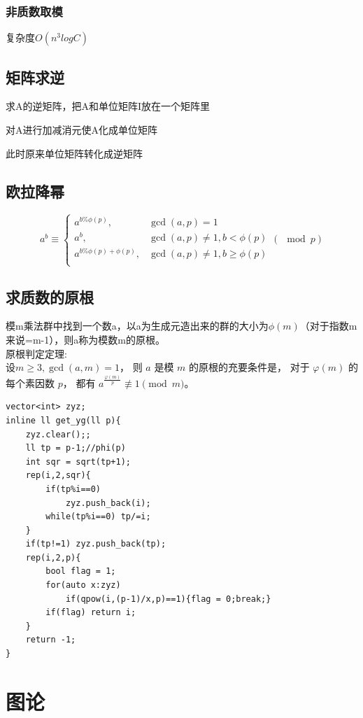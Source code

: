 \documentclass[a4]{ctexart}
\begin{document}
\subsubsection{非质数取模}
复杂度$O(n^3 logC)$

\subsection{矩阵求逆}
求A的逆矩阵，把A和单位矩阵I放在一个矩阵里\par
对A进行加减消元使A化成单位矩阵\par
此时原来单位矩阵转化成逆矩阵
\subsection{欧拉降幂}
$$
a^b \equiv \begin{cases}
a^{b\%\phi(p)} , & \gcd(a,p)=1\\
a^b , & \gcd(a,p)\neq 1,b<\phi(p)\\
a^{b\%\phi(p)+\phi(p)} , & \gcd(a,p)\neq 1 , b\geq \phi(p)\\
\end{cases}
(\mod p)
$$

\subsection{求质数的原根}
模m乘法群中找到一个数a，以a为生成元造出来的群的大小为$\phi(m)$（对于指数m来说=m-1），则a称为模数m的原根。\\
原根判定定理:\\
设$m \geq 3, \gcd(a,m)=1$，
则 $a$ 是模 $m$ 的原根的充要条件是，
对于 $\varphi(m)$ 的每个素因数 $p$，
都有 $a^{\frac{\varphi(m)}{p}}\not\equiv 1\pmod m$。
\begin{lstlisting}
vector<int> zyz;
inline ll get_yg(ll p){
    zyz.clear();;
    ll tp = p-1;//phi(p)
    int sqr = sqrt(tp+1);
    rep(i,2,sqr){
        if(tp%i==0)
            zyz.push_back(i);
        while(tp%i==0) tp/=i;
    }
    if(tp!=1) zyz.push_back(tp);
    rep(i,2,p){
        bool flag = 1;
        for(auto x:zyz)
            if(qpow(i,(p-1)/x,p)==1){flag = 0;break;}
        if(flag) return i;
    }
    return -1;
}
\end{lstlisting}


\section{图论}
\end{document}
